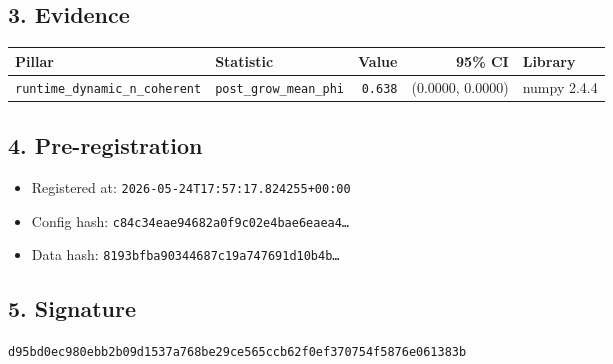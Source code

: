 \documentclass{article}
\begin{document}
\subsection*{3. Evidence}
\begin{tabular}{llrrl}\toprule
\textbf{Pillar} & \textbf{Statistic} & \textbf{Value} & \textbf{95\% CI} & \textbf{Library} \\\midrule
\texttt{runtime\_dynamic\_n\_coherent} & \texttt{post\_grow\_mean\_phi} & \texttt{0.638} & (0.0000, 0.0000) & numpy 2.4.4 \\
\bottomrule\end{tabular}
\subsection*{4. Pre-registration}
\begin{itemize}
\item Registered at: \texttt{2026-05-24T17:57:17.824255+00:00}
\item Config hash: \texttt{c84c34eae94682a0f9c02e4bae6eaea4\dots}
\item Data hash: \texttt{8193bfba90344687c19a747691d10b4b\dots}
\end{itemize}
\subsection*{5. Signature}
\texttt{d95bd0ec980ebb2b09d1537a768be29ce565ccb62f0ef370754f5876e061383b}\\
\end{document}
